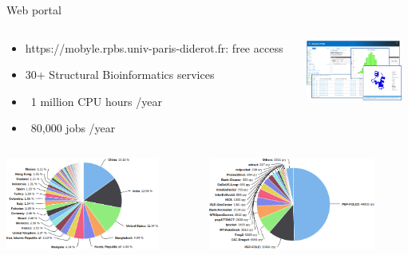 \documentclass{beamer}
\begin{document}
\begin{frame}[fragile]{Web portal}
\begin{columns}
    \begin{column}{0.7\textwidth}
        \begin{itemize}
            \item https://mobyle.rpbs.univ-paris-diderot.fr: free access
            \item 30+ Structural Bioinformatics services
            \item ~1 million CPU hours /year
            \item ~80,000 jobs /year
        \end{itemize}
    \end{column}
    \begin{column}{0.3\textwidth}
        \includegraphics[height = 2cm]{Images/mobyle.png}
    \end{column}
\end{columns}
\begin{columns}
    \begin{column}{0.5\textwidth}
        \includegraphics[height = 3cm]{Images/country2022.png}
    \end{column}
    \begin{column}{0.5\textwidth}
        \includegraphics[height = 3cm]{Images/service2022.png}
    \end{column}
\end{columns}
\end{frame}
\end{document}
